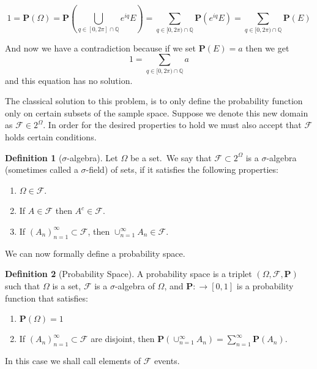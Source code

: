 \documentclass[11pt,a4paper]{article}
\theoremstyle{definition}
\newtheorem{definition}{Definition}[section]
\theoremstyle{plain}
\newcommand{\Q}{\mathbb{Q}}
\newcommand{\Prob}{\mathbf{P}}
\begin{document}
  \[
    1 = \Prob(\Omega) = 
    \Prob\left({\bigcup_{q \in [0,2\pi] \cap \Q}}{e^{i q} E}\right) = 
    \sum_{q \in [0,2\pi) \cap \Q}{\Prob(e^{i q} E)} = 
    \sum_{q \in [0,2\pi) \cap \Q}{\Prob(E)}
  \]

  And now we have a contradiction because if we set $\Prob(E) = a$ then
  we get
  \[ 1 = \sum_{q \in [0,2\pi) \cap \Q}{a} \]
  and this equation has no solution.

  The classical solution to this problem, is to only define the probability
  function only on certain subsets of the sample space. Suppose we denote
  this new domain as $\mathcal F \in 2^\Omega$. In order for the desired
  properties to hold we must also accept that $\mathcal F$ holds certain
  conditions.

  \begin{definition}[$\sigma$-algebra]
    Let $\Omega$ be a set.\ We say that $\mathcal F \subset 2^\Omega$ is a
    $\sigma$-algebra (sometimes called a $\sigma$-field) of sets, if it
    satisfies the following properties:
    \begin{enumerate}
      \item $\Omega \in \mathcal F$.
      \item If $A \in \mathcal F$ then $A^c \in \mathcal F$.
      \item If $(A_n)_{n=1}^{\infty} \subset \mathcal F$, then
        $\cup_{n=1}^{\infty}{A_n} \in \mathcal F$.
    \end{enumerate}
  \end{definition}

  We can now formally define a probability space.

  \begin{definition}[Probability Space]
    A probability space is a triplet $(\Omega, \mathcal F, \Prob)$ such
    that $\Omega$ is a set, $\mathcal F$ is a $\sigma$-algebra of $\Omega$,
    and $\Prob \colon \mathcal \to [0,1]$ is a probability function that
    satisfies:
    \begin{enumerate}
      \item $\Prob(\Omega) = 1$
      \item If $(A_n)_{n=1}^{\infty} \subset \mathcal F$ are disjoint, then
        $\Prob\left(\cup_{n=1}^{\infty}{A_n}\right) = 
        \sum_{n=1}^{\infty}{\Prob(A_n)}$.
    \end{enumerate}
  \end{definition}

  In this case we shall call elements of $\mathcal F$ events.
\end{document}
